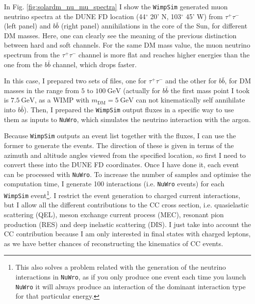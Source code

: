 In Fig. \ref{fig:solardm_nu_mu_spectra} I show the \texttt{WimpSim} \cite{Blennow2007, WimpSim} generated muon neutrino spectra at the DUNE FD location (44$^{\circ} $ 20' N, 103$^{\circ} $ 45' W) from $\tau^{+} \tau^{-}$ (left panel) and $b\bar{b}$ (right panel) annihilations in the core of the Sun, for different DM masses. Here, one can clearly see the meaning of the previous distinction between hard and soft channels. For the same DM mass value, the muon neutrino spectrum from the $\tau^{+} \tau^{-}$ channel is more flat and reaches higher energies than the one from the $b\bar{b}$ channel, which drops faster.

In this case, I prepared two sets of files, one for $\tau^{+} \tau^{-}$ and the other for $b\bar{b}$, for DM masses in the range from $5$ to $100 \ \mathrm{GeV}$ (actually for $b\bar{b}$ the first mass point I took is $7.5 \ \mathrm{GeV}$, as a WIMP with $m_{\mathrm{DM}}=5 \ \mathrm{GeV}$ can not kinematically self annihilate into $b\bar{b}$). Then, I prepared the \texttt{WimpSim} output fluxes in a specific way to use them as inputs to \texttt{NuWro}, which simulates the neutrino interaction with the argon.

Because \texttt{WimpSim} outputs an event list together with the fluxes, I can use the former to generate the events. The direction of these is given in terms of the azimuth and altitude angles viewed from the specified location, so first I need to convert these into the DUNE FD coordinates. Once I have done it, each event can be processed with \texttt{NuWro}. To increase the number of samples and optimise the computation time, I generate 100 interactions (i.e. \texttt{NuWro} events) for each \texttt{WimpSim} event\footnote{This also solves a problem related with the generation of the neutrino interactions in \texttt{NuWro}, as if you only produce one event each time you launch \texttt{NuWro} it will always produce an interaction of the dominant interaction type for that particular energy.}. I restrict the event generation to charged current interactions, but I allow all the different contributions to the CC cross section, i.e. quasielastic scattering (QEL), meson exchange current process (MEC), resonant pion production (RES) and deep inelastic scattering (DIS). I just take into account the CC contribution because I am only interested in final states with charged leptons, as we have better chances of reconstructing the kinematics of CC events.

